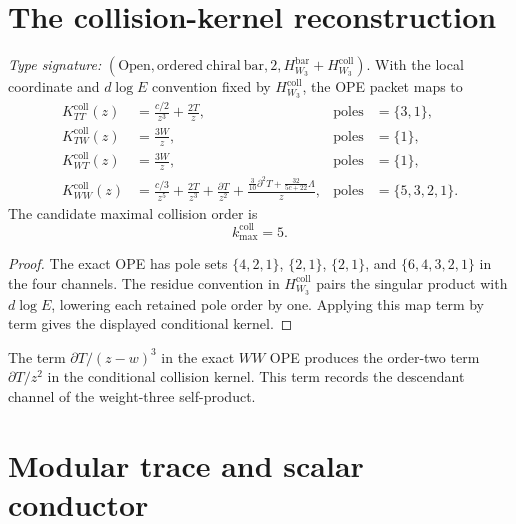 \section{The collision-kernel reconstruction}
\label{sec:w3hol-r-matrix-channels}

\begin{theorem}
\label{thm:w3hol-r-channels}
\emph{Type signature:}
\((\mathrm{Open},\mathrm{ordered\ chiral\ bar},2,
H_{W_3}^{\mathrm{bar}}+H_{W_3}^{\mathrm{coll}})\).
With the local coordinate and \(d\log E\) convention fixed by
\(H_{W_3}^{\mathrm{coll}}\), the OPE packet maps to
\begin{align}
K_{TT}^{\mathrm{coll}}(z)
&=\frac{c/2}{z^3}+\frac{2T}{z},
&\operatorname{poles}&=\{3,1\},
\label{eq:w3hol-r-TT}\\
K_{TW}^{\mathrm{coll}}(z)
&=\frac{3W}{z},
&\operatorname{poles}&=\{1\},
\label{eq:w3hol-r-TW}\\
K_{WT}^{\mathrm{coll}}(z)
&=\frac{3W}{z},
&\operatorname{poles}&=\{1\},
\label{eq:w3hol-r-WT}\\
K_{WW}^{\mathrm{coll}}(z)
&=\frac{c/3}{z^5}
+\frac{2T}{z^3}
+\frac{\partial T}{z^2}
+\frac{\frac3{10}\partial^2T
+\frac{32}{5c+22}\Lambda}{z},
&\operatorname{poles}&=\{5,3,2,1\}.
\label{eq:w3hol-r-WW}
\end{align}
The candidate maximal collision order is
\begin{equation}\label{eq:w3hol-kmax}
k_{\max}^{\mathrm{coll}}=5.
\end{equation}
\end{theorem}

\begin{proof}
The exact OPE has pole sets
\(\{4,2,1\}\), \(\{2,1\}\), \(\{2,1\}\), and
\(\{6,4,3,2,1\}\) in the four channels.  The residue convention in
\(H_{W_3}^{\mathrm{coll}}\) pairs the singular product with
\(d\log E\), lowering each retained pole order by one.  Applying this
map term by term gives the displayed conditional kernel.
\end{proof}

\begin{remark}
\label{rem:w3hol-even-pole}
The term \(\partial T/(z-w)^3\) in the exact \(WW\) OPE produces the
order-two term \(\partial T/z^2\) in the conditional collision
kernel.  This term records the descendant channel of the weight-three
self-product.
\end{remark}

\section{Modular trace and scalar conductor}
\label{sec:w3hol-kappa}

